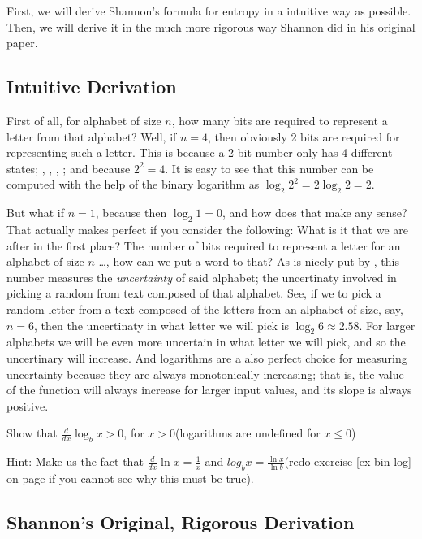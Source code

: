 First, we will derive Shannon's formula for entropy in a intuitive way
as possible. Then, we will derive it in the much more rigorous way
Shannon did in his original paper.

\subsection{Intuitive Derivation}

First of all, for alphabet of size $n$, how many bits are required to
represent a letter from that alphabet? Well, if $n=4$, then obviously
2 bits are required for representing such a letter. This is because a
2-bit number only has 4 different states; , ,
, ; and because $2^2 = 4$. It is easy to see that this
number can be computed with the help of the binary logarithm as
$\log_2 2^2 = 2\log_2 2 = 2$.

But what if $n=1$, because then $\log_2 1 = 0$, and how does that make
any sense? That actually makes perfect if you consider the following:
What is it that we are after in the first place? The number of bits
required to represent a letter for an alphabet of size $n$ \dots, how
can we put a word to that? As is nicely put by \cite{schneider2008},
this number measures the \textit{uncertainty} of said alphabet; the
uncertinaty involved in picking a random from text composed of that
alphabet. See, if we to pick a random letter from a text composed of
the letters from an alphabet of size, say, $n=6$, then the uncertinaty
in what letter we will pick is $\log_2 6 \approx 2.58$. For larger
alphabets we will be even more uncertain in what letter we will pick,
and so the uncertinary will increase. And logarithms are a also
perfect choice for measuring uncertainty because they are always
monotonically increasing; that is, the value of the function will
always increase for larger input values, and its slope is always
positive.

\begin{Exercise}[label={deriv-log}]
  Show that $\frac{d}{dx} \log_b x > 0$, for $x > 0$(logarithms
  are undefined for $x \le 0$)

  Hint: Make us the fact that $\frac{d}{dx} \ln x = \frac{1}{x}$ and
  $log_b x = \frac{\ln x}{\ln b}$(redo exercise \ref{ex-bin-log} on
  page \pageref{ex-bin-log} if you cannot see why this must be true).

\end{Exercise}

\subsection{Shannon's Original, Rigorous Derivation}

